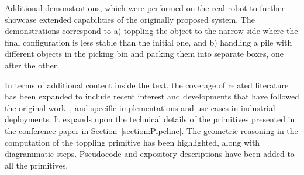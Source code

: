 {Additional demonstrations, which were performed on the real robot to further showcase extended capabilities of the originally proposed system. The demonstrations correspond to a) toppling the object to the narrow side where the final configuration is less stable than the initial one, and b) handling a pile with different objects in the picking bin and packing them into separate boxes, one after the other. 

In terms of additional content inside the text, the coverage of related literature has been expanded to include recent interest and developments that have followed the original work~\cite{shome2019towards}, and specific implementations and use-cases in industrial deployments. It expands upon the technical details of the primitives presented in the conference paper in Section~\ref{section:Pipeline}. The geometric reasoning in the computation of the toppling primitive has been highlighted, along with diagrammatic steps. Pseudocode and expository descriptions have been added to all the primitives.


}


